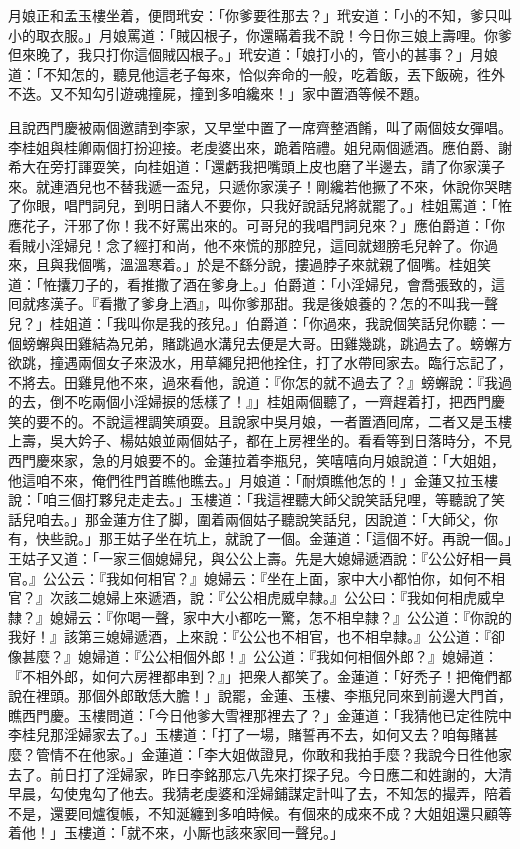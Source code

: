 月娘正和孟玉樓坐着，便問玳安：「你爹要徃那去？」玳安道：「小的不知，爹只叫小的取衣服。」月娘罵道：「賊囚根子，你還瞞着我不說！今日你三娘上壽哩。你爹但來晚了，我只打你這個賊囚根子。」玳安道：「娘打小的，管小的甚事？」月娘道：「不知怎的，聽見他這老子每來，恰似奔命的一般，吃着飯，丟下飯碗，徃外不迭。又不知勾引遊魂撞屍，撞到多咱纔來！」家中置酒等候不題。

且說西門慶被兩個邀請到李家，又早堂中置了一席齊整酒餚，叫了兩個妓女彈唱。李桂姐與桂卿兩個打扮迎接。老虔婆出來，跪着陪禮。姐兒兩個遞酒。應伯爵、謝希大在旁打諢耍笑，向桂姐道：「還虧我把嘴頭上皮也磨了半邊去，請了你家漢子來。就連酒兒也不替我遞一盃兒，只遞你家漢子！剛纔若他撅了不來，休說你哭瞎了你眼，{}唱門詞兒，到明日諸人不要你，只我好說話兒將就罷了。」桂姐罵道：「恠應花子，汗邪了你！我不好罵出來的。可哥兒的我唱門詞兒來？」應伯爵道：「你看賊小淫婦兒！念了經打和尚，他不來慌的那腔兒，這囘就翅膀毛兒幹了。你過來，且與我個嘴，溫溫寒着。」於是不繇分說，摟過脖子來就親了個嘴。桂姐笑道：「恠攮刀子的，看推撒了酒在爹身上。」伯爵道：「小淫婦兒，會喬張致的，這囘就疼漢子。『看撒了爹身上酒』，叫你爹那甜。我是後娘養的？怎的不叫我一聲兒？」桂姐道：「我叫你是我的孩兒。」伯爵道：「你過來，我說個笑話兒你聽：一個螃蠏與田雞結為兄弟，賭跳過水溝兒去便是大哥。田雞幾跳，跳過去了。螃蠏方欲跳，撞遇兩個女子來汲水，用草繩兒把他拴住，打了水帶囘家去。臨行忘記了，不將去。田雞見他不來，過來看他，說道：『你怎的就不過去了？』螃蠏說：『我過的去，倒不吃兩個小淫婦捩的恁樣了！』」桂姐兩個聽了，一齊趕着打，把西門慶笑的要不的。不說這裡調笑頑耍。且說家中吳月娘，一者置酒囘席，二者又是玉樓上壽，吳大妗子、楊姑娘並兩個姑子，都在上房裡坐的。看看等到日落時分，不見西門慶來家，急的月娘要不的。金蓮拉着李瓶兒，笑嘻嘻向月娘說道：「大姐姐，他這咱不來，俺們徃門首瞧他瞧去。」月娘道：「耐煩瞧他怎的！」{}金蓮又拉玉樓說：「咱三個打夥兒走走去。」玉樓道：「我這裡聽大師父說笑話兒哩，等聽說了笑話兒咱去。」那金蓮方住了脚，圍着兩個姑子聽說笑話兒，因說道：「大師父，你有，快些說。」那王姑子坐在坑上，就說了一個。金蓮道：「這個不好。再說一個。」{}王姑子又道：「一家三個媳婦兒，與公公上壽。先是大媳婦遞酒說：『公公好相一員官。』公公云：『我如何相官？』媳婦云：『坐在上面，家中大小都怕你，如何不相官？』次該二媳婦上來遞酒，說：『公公相虎威皁隸。』公公曰：『我如何相虎威皁隸？』媳婦云：『你喝一聲，家中大小都吃一驚，怎不相皁隸？』公公道：『你說的我好！』該第三媳婦遞酒，上來說：『公公也不相官，也不相皁隸。』公公道：『卻像甚麼？』媳婦道：『公公相個外郎！』公公道：『我如何相個外郎？』媳婦道：『不相外郎，如何六房裡都串到？』」{}把衆人都笑了。金蓮道：「好禿子！把俺們都說在裡頭。那個外郎敢恁大膽！」說罷，金蓮、玉樓、李瓶兒同來到前邊大門首，瞧西門慶。玉樓問道：「今日他爹大雪裡那裡去了？」金蓮道：「我猜他已定徃院中李桂兒那淫婦家去了。」玉樓道：「打了一場，賭誓再不去，如何又去？咱每賭甚麼？管情不在他家。」金蓮道：「李大姐做證見，你敢和我拍手麼？我說今日徃他家去了。前日打了淫婦家，昨日李銘那忘八先來打探子兒。{}今日應二和姓謝的，大清早晨，勾使鬼勾了他去。我猜老虔婆和淫婦鋪謀定計叫了去，不知怎的撮弄，陪着不是，還要囘爐復帳，不知涎纏到多咱時候。有個來的成來不成？大姐姐還只顧等着他！」玉樓道：「就不來，小厮也該來家囘一聲兒。」

